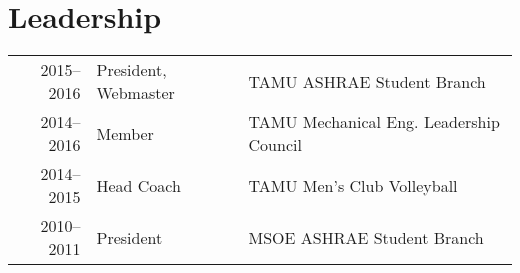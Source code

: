 \documentclass[]{deedy-resume-openfont}
\begin{document}
\begin{minipage}[t]{0.66\textwidth}

\section{Leadership}
\begin{tabular}{rll}
    2015--2016 & President, Webmaster & TAMU ASHRAE Student Branch                     \\
    2014--2016 & Member               & TAMU Mechanical Eng. Leadership Council \\
    2014--2015 & Head Coach           & TAMU Men's Club Volleyball                     \\
    2010--2011 & President            & MSOE ASHRAE Student Branch
\end{tabular}



\sectionsep

\end{minipage}
\end{document}
